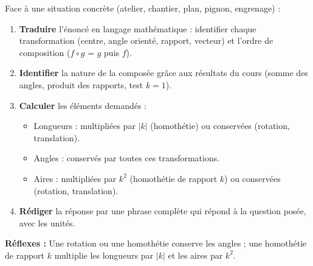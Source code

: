 \documentclass[11pt]{article}
\begin{document}
\begin{methode}
Face à une situation concrète (atelier, chantier, plan, pignon, engrenage) :
\begin{enumerate}
\item \textbf{Traduire} l'énoncé en langage mathématique : identifier chaque transformation (centre, angle orienté, rapport, vecteur) et l'ordre de composition ($f \circ g$ = $g$ puis $f$).
\item \textbf{Identifier} la nature de la composée grâce aux résultats du cours (somme des angles, produit des rapports, test $k=1$).
\item \textbf{Calculer} les éléments demandés :
      \begin{itemize}
      \item Longueurs : multipliées par $|k|$ (homothétie) ou conservées (rotation, translation).
      \item Angles : conservés par toutes ces transformations.
      \item Aires : multipliées par $k^2$ (homothétie de rapport $k$) ou conservées (rotation, translation).
      \end{itemize}
\item \textbf{Rédiger} la réponse par une phrase complète qui répond à la question posée, avec les unités.
\end{enumerate}
\textbf{Réflexes :} Une rotation ou une homothétie conserve les angles ; une homothétie de rapport $k$ multiplie les longueurs par $|k|$ et les aires par $k^2$.
\end{methode}
\end{document}

